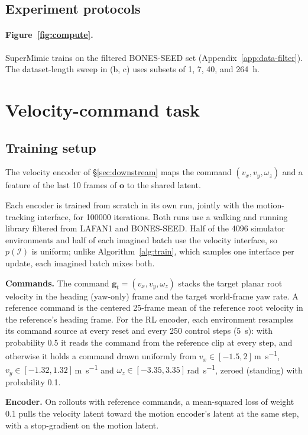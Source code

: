 \subsection{Experiment protocols}

\paragraph{Figure~\ref{fig:compute}.}
SuperMimic trains on the filtered BONES-SEED set (Appendix~\ref{app:data-filter}). The dataset-length sweep in (b, c) uses subsets of 1, 7, 40, and \qty{264}{\hour}.

\section{Velocity-command task}
\label{app:velocity}

\subsection{Training setup}
The velocity encoder of \S\ref{sec:downstream} maps the command $(v_x, v_y, \omega_z)$ and a feature of the last 10 frames of $\bm{o}$ to the shared latent.

Each encoder is trained from scratch in its own run, jointly with the motion-tracking interface, for \num{100000} iterations. Both runs use a walking and running library filtered from LAFAN1 and BONES-SEED. Half of the 4096 simulator environments and half of each imagined batch use the velocity interface, so $p(\mathcal{I})$ is uniform; unlike Algorithm~\ref{alg:train}, which samples one interface per update, each imagined batch mixes both.

\noindent\textbf{Commands.} The command $\bm{g}_t = (v_x, v_y, \omega_z)$ stacks the target planar root velocity in the heading (yaw-only) frame and the target world-frame yaw rate. A reference command is the centered 25-frame mean of the reference root velocity in the reference's heading frame. For the RL encoder, each environment resamples its command source at every reset and every 250 control steps (\qty{5}{\second}): with probability 0.5 it reads the command from the reference clip at every step, and otherwise it holds a command drawn uniformly from $v_x \in [\num{-1.5}, 2]$\,\unit{\metre\per\second}, $v_y \in [\num{-1.32}, 1.32]$\,\unit{\metre\per\second} and $\omega_z \in [\num{-3.35}, 3.35]$\,\unit{\radian\per\second}, zeroed (standing) with probability 0.1.

\noindent\textbf{Encoder.} On rollouts with reference commands, a mean-squared loss of weight 0.1 pulls the velocity latent toward the motion encoder's latent at the same step, with a stop-gradient on the motion latent.

